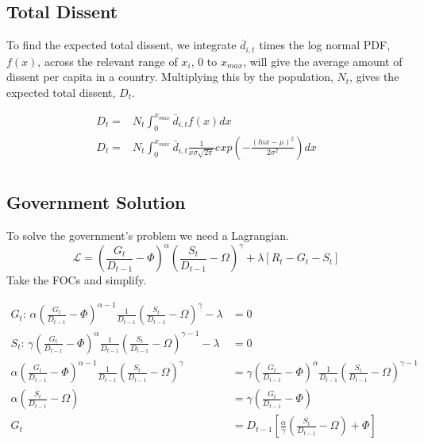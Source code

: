 \documentclass[12pt]{article}
\begin{document}
\begin{spacing}{1.5}
\subsection{Total Dissent}
 
To find the expected total dissent, we integrate $\overline{d}_{i,t}$ times the log normal PDF, $f(x)$, across the relevant range of $x_i$, $0$ to $x_{max}$, will give the average amount of dissent per capita in a country. Multiplying this by the population, $N_t$, gives the expected total dissent, $D_t$.

\begin{equation}
	\begin{aligned}
D_t=& N_t \int_{0}^{x_{max}} \bar{d}_{i,t} f(x) dx \\	
D_t	=& N_t \int_{0}^{x_{max}} \bar{d}_{i,t} \frac{1}{x\sigma \sqrt{2\pi}}exp  \left( -\frac{(lnx-\mu)^2}{2\sigma^2} \right)  dx \\	
	\end{aligned}
\end{equation}


\subsection{Government Solution}

To solve the government's problem we need a Lagrangian.
\begin{equation}
\mathcal{L} = \left(\frac{G_t}{ D_{t-1}}-\Phi\right)^\alpha \left(\frac{S_t}{ D_{t-1}}-\Omega\right)^\gamma  +\lambda[R_t-G_t-S_t] 
\end{equation}
Take the FOCs and simplify.

\begin{equation}
    \begin{aligned}
        G_t\text{: } \alpha \left(\frac{G_t}{ D_{t-1}}-\Phi\right)^{\alpha-1} \frac{1}{ D_{t-1}} \left(\frac{S_t}{D_{t-1}}-\Omega\right)^\gamma  -\lambda &=0  \\
S_t\text{: } \gamma  \left(\frac{G_t}{ D_{t-1}}-\Phi\right)^{\alpha} \frac{1}{D_{t-1}} \left(\frac{S_t}{D_{t-1}}-\Omega\right)^{\gamma -1} -\lambda &=0 \\
\alpha \left(\frac{G_t}{D_{t-1}}-\Phi\right)^{\alpha-1} \frac{1}{ D_{t-1}} \left(\frac{S_t}{D_{t-1}}-\Omega\right)^\gamma  &= \gamma  \left(\frac{G_t}{ D_{t-1}}-\Phi\right)^{\alpha} \frac{1}{ D_{t-1}} \left(\frac{S_t}{ D_{t-1}}-\Omega\right)^{\gamma -1} \\
\alpha \left(\frac{S_t}{ D_{t-1}}-\Omega \right) &= \gamma  \left( \frac{G_t}{ D_{t-1}}-\Phi \right) \\
G_t&= D_{t-1}\left[\frac{\alpha}{\gamma } \left(\frac{S_t}{ D_{t-1}} -\Omega \right)+\Phi \right]
    \end{aligned}
\end{equation}



\end{spacing}
\end{document}
